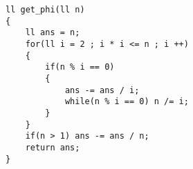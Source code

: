 \documentclass[E:/GsjzTle/main/main.tex]{subfiles}
\begin{document}
\begin{lstlisting}
ll get_phi(ll n)
{
	ll ans = n;
	for(ll i = 2 ; i * i <= n ; i ++)
	{
		if(n % i == 0)
		{
			ans -= ans / i;
			while(n % i == 0) n /= i;
		}
	}
	if(n > 1) ans -= ans / n;
	return ans;
}
\end{lstlisting}
\end{document}
